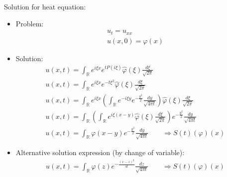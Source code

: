\documentclass[12pt, a4paper]{article}
\begin{document}
Solution for heat equation:
\begin{itemize}
    \item Problem:
    \begin{gather*}
        u_t = u_{xx}\\
        u(x, 0) = \varphi(x)
    \end{gather*}
    \item Solution:
    \begin{gather*}
        u(x, t) = \int_{\mathbb{R}} e^{i\xi x}e^{tP(i\xi)}\hat{\varphi}(\xi)\frac{d\xi}{\sqrt{2\pi}}\\
        u(x, t) = \int_{\mathbb{R}} e^{i\xi x}e^{-t\xi^2}\hat{\varphi}(\xi)\frac{d\xi}{\sqrt{2\pi}}\\
        u(x, t) = \int_{\mathbb{R}} e^{i\xi x}\left(\int_{\mathbb{R}}e^{-i\xi y}e^{-\frac{y^2}{2}}\frac{dy}{\sqrt{4\pi t}}\right)\hat{\varphi}(\xi)\frac{d\xi}{\sqrt{2\pi}}\\
        u(x, t) = \int_{\mathbb{R}} \left(\int_{\mathbb{R}} e^{i\xi(x-y)}\hat{\varphi}(\xi)\frac{d\xi}{\sqrt{2\pi}}\right)e^{-\frac{y^2}{2}}\frac{dy}{\sqrt{4\pi t}}\\
        u(x, t) = \int_{\mathbb{R}} \varphi(x-y)e^{-\frac{y^2}{2}}\frac{dy}{\sqrt{4\pi t}} \qquad \Rightarrow S(t)(\varphi)(x)
    \end{gather*}
    \item Alternative solution expression (by change of variable):
    \begin{gather*}
        u(x, t) = \int_{\mathbb{R}} \varphi(z)e^{-\frac{(x-z)^2}{4t}}\frac{dz}{\sqrt{4\pi t}} \qquad \Rightarrow S(t)(\varphi)(x)
    \end{gather*}

\end{itemize}
\end{document}
